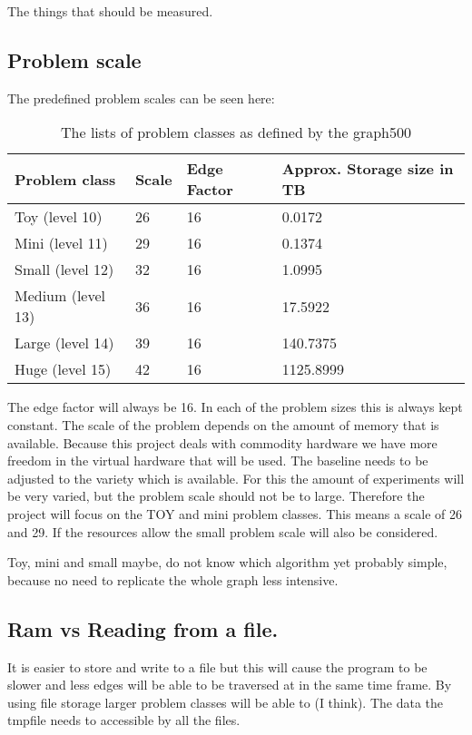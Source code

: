 The things that should be measured.



\subsection{Problem scale}
The predefined problem scales can be seen here:
\begin{table}
\begin{tabular}{|l|l|l|l|}
\hline
Problem class & Scale & Edge Factor & Approx. Storage size in TB\\ \hline
Toy (level 10) &	26 &	16 &	0.0172\\ \hline
Mini (level 11) &	29 &	16 &	0.1374\\ \hline
Small (level 12) &	32 &	16 &	1.0995\\ \hline
Medium (level 13)& 	36 &	16 &	17.5922\\ \hline
Large (level 14) &	39 &	16 &	140.7375\\ \hline
Huge (level 15) &	42 &	16 &	1125.8999\\ \hline
\end{tabular}
\label{tab:problem_scales}
\caption{The lists of problem classes as defined by the graph500}
\end{table}



The edge factor will always be 16. In each of the problem sizes this is always kept constant.
The scale of the problem depends on the amount of memory that is available. Because this project deals with commodity hardware we have more freedom in the virtual hardware that will be used. The baseline needs to be adjusted to the variety which is available. For this the amount of experiments will be very varied, but the problem scale should not be to large. Therefore the project will focus on the TOY and mini problem classes. This means a scale of 26 and 29. If the resources allow the small problem scale will also be considered.

Toy, mini and small maybe, do not know which algorithm yet probably simple, because no need to replicate the whole graph less intensive.

\subsection{Ram vs Reading from a file.}
It is easier to store and write to a file but this will cause the program to be slower and less edges will be able to be traversed at in the same time frame. By using file storage larger problem classes will be able to (I think). The data the tmpfile needs to accessible by all the files.


